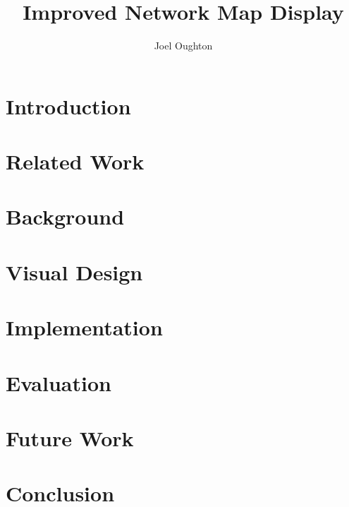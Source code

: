 \documentclass{article}
\title{Improved Network Map Display}
\author{Joel Oughton}
\date{}
\begin{document}
\maketitle

\begin{abstract}

\end{abstract}

\section{Introduction}
\label{sec:introduction}

\section{Related Work}
\label{sec:related-work}

\section{Background}
\label{sec:background}

\section{Visual Design}
\label{sec:visual-design}

\section{Implementation} 
\label{sec:implementation}

\section{Evaluation}
\label{sec:evaluation}

\section{Future Work}
\label{sec:future-work}

\section{Conclusion}
\label{sec:conclusion}



\end{document}
